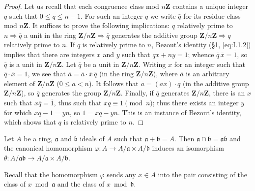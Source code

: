 \begin{proof}
Let us recall that each congruence class mod $n\mathbf{Z}$ contains a unique
integer $q$ such that $0\leq q\leq n-1$. For such an integer $q$ we write
$\bar{q}$ for its residue class mod $n\mathbf{Z}$. It suffices to prove the
following implications: $q$ relatively prime to $n\Rightarrow\bar{q}$ a unit
in the ring $\mathbf{Z}/n\mathbf{Z}\Rightarrow\bar{q}$ generates the
additive group $\mathbf{Z}/n\mathbf{Z}\Rightarrow q$ relatively prime to
$n$. If $q$ is relatively prime to $n$, Bezout's identity
(\hyperref[sec:1.1]{§1}, \eqref{eq:I.1.2}) implies that there are integers $x$ and $y$ such that
$qx+ny=1$; whence $\bar{q}\,\bar{x}=\overline{1}$, so $\bar{q}$ is a unit in
$\mathbf{Z}/n\mathbf{Z}$. Let $\bar{q}$ be a unit in
$\mathbf{Z}/n\mathbf{Z}$. Writing $x$ for an integer such that
$\bar{q}\cdot\bar{x}=1$, we see that
$\bar{a}=\bar{a}\cdot\bar{x}\,\bar{q}$ (in the ring
$\mathbf{Z}/n\mathbf{Z}$), where $\bar{a}$ is an arbitrary element of
$\mathbf{Z}/n\mathbf{Z}$ ($0\leq a<n$). It follows that
$\bar{a}=(ax)\cdot\bar{q}$ (in the additive group
$\mathbf{Z}/n\mathbf{Z}$), so $\bar{q}$ generates the group
$\mathbf{Z}/n\mathbf{Z}$. Finally, if $\bar{q}$ generates
$\mathbf{Z}/n\mathbf{Z}$, there is an $x$ such that $x\bar{q}=\overline{1}$,
thus such that $xq\equiv1\pmod{n}$; thus there exists an integer $y$ for
which $xq-1=yn$, so $1=xq-yn$. This is an instance of Bezout's identity,
which shows that $q$ is relatively prime to $n$.
\end{proof}

\begin{lemma}
\label{lem:I.3.1}
Let $A$ be a ring, $\mathfrak{a}$ and $\mathfrak{b}$ ideals of $A$ such that
$\mathfrak{a}+\mathfrak{b}=A$. Then
$\mathfrak{a}\cap\mathfrak{b}=\mathfrak{a}\mathfrak{b}$ and the canonical
homomorphism $\varphi:A\to A/\mathfrak{a}\times A/\mathfrak{b}$ induces an
isomorphism $\theta:A/\mathfrak{a}\mathfrak{b}\to
A/\mathfrak{a}\times A/\mathfrak{b}$.
\end{lemma}

Recall that the homomorphism $\varphi$ sends any $x\in A$ into the pair
consisting of the class of $x\bmod\mathfrak{a}$ and the class of
$x\bmod\mathfrak{b}$.

